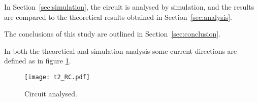 In Section~\ref{sec:simulation}, the circuit is analysed by
simulation, and the results are compared to the theoretical results obtained in
Section~\ref{sec:analysis}.

The conclusions of this study are outlined in
Section~\ref{sec:conclusion}.

In both the theoretical and simulation analysis some
current directions are defined as in figure \ref{fig:rc}.

\begin{figure}[h] \centering
    \texttt{[image: t2\_RC.pdf]}
    \caption{Circuit analysed.}
    \label{fig:rc}
\end{figure}

